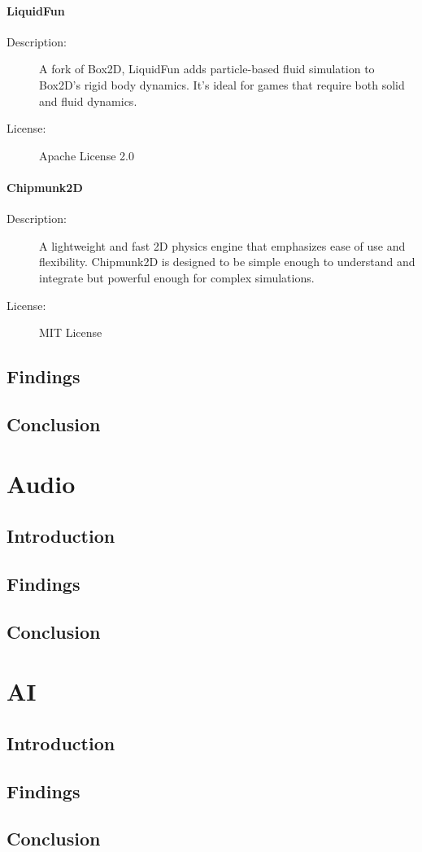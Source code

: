 \documentclass{projdoc}
\begin{document}
\paragraph{LiquidFun}
\begin{description}
	\item[Description:] A fork of Box2D, LiquidFun adds particle-based fluid simulation to Box2D's rigid body dynamics. It’s ideal for games that require both solid and fluid dynamics.
	\item[License:] Apache License 2.0
\end{description}

\paragraph{Chipmunk2D}
\begin{description}
	\item[Description:] A lightweight and fast 2D physics engine that emphasizes ease of use and flexibility. Chipmunk2D is designed to be simple enough to understand and integrate but powerful enough for complex simulations.
	\item[License:] MIT License
\end{description}



\subsection{Findings}

\subsection{Conclusion}

\section{Audio}

\subsection{Introduction}

\subsection{Findings}

\subsection{Conclusion}

\section{AI}

\subsection{Introduction}

\subsection{Findings}

\subsection{Conclusion}
\end{document}
